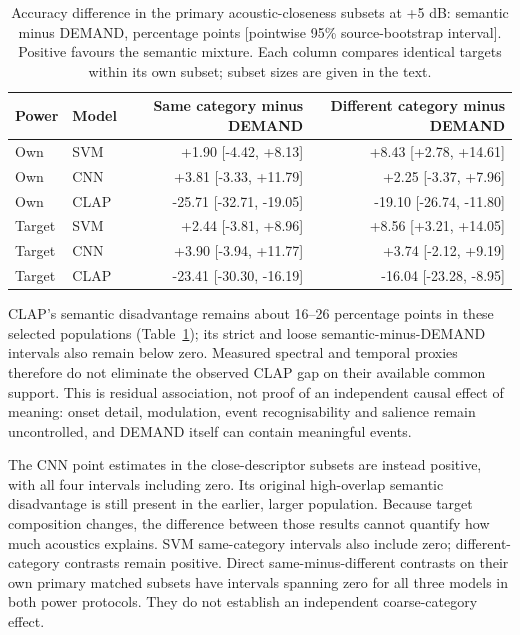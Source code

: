\begin{table}[htbp]\centering\small
\caption{Accuracy difference in the primary acoustic-closeness subsets at +5 dB: semantic minus DEMAND, percentage points [pointwise 95\% source-bootstrap interval]. Positive favours the semantic mixture. Each column compares identical targets within its own subset; subset sizes are given in the text.}
\label{tab:acoustic-matched}\begin{tabular}{llrr}\toprule
Power & Model & Same category minus DEMAND & Different category minus DEMAND\\\midrule
Own & SVM & +1.90 [-4.42, +8.13] & +8.43 [+2.78, +14.61] \\
Own & CNN & +3.81 [-3.33, +11.79] & +2.25 [-3.37, +7.96] \\
Own & CLAP & -25.71 [-32.71, -19.05] & -19.10 [-26.74, -11.80] \\
\midrule
Target & SVM & +2.44 [-3.81, +8.96] & +8.56 [+3.21, +14.05] \\
Target & CNN & +3.90 [-3.94, +11.77] & +3.74 [-2.12, +9.19] \\
Target & CLAP & -23.41 [-30.30, -16.19] & -16.04 [-23.28, -8.95] \\
\bottomrule\end{tabular}\end{table}

CLAP's semantic disadvantage remains about 16--26 percentage points in these
selected populations (Table~\ref{tab:acoustic-matched}); its strict and loose
semantic-minus-DEMAND intervals also remain below zero. Measured spectral and
temporal proxies therefore do not eliminate the observed CLAP gap on their
available common support. This is residual association, not proof of an
independent causal effect of meaning: onset detail, modulation, event
recognisability and salience remain uncontrolled, and DEMAND itself can contain
meaningful events.

The CNN point estimates in the close-descriptor subsets are instead positive,
with all four intervals including zero. Its original high-overlap semantic
disadvantage is still present in the earlier, larger population. Because target
composition changes, the difference between those results cannot quantify how
much acoustics explains. SVM same-category intervals also include zero;
different-category contrasts remain positive. Direct same-minus-different
contrasts on their own primary matched subsets have intervals spanning zero
for all three models in both power protocols. They do not establish an
independent coarse-category effect.

